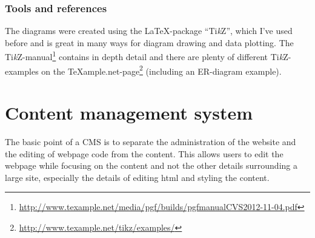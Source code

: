 \documentclass[12pt, a4paper,titlepage]{article}
\begin{document}
\subsubsection{Tools and references}
The diagrams were created using the \LaTeX-package
``Ti\emph{k}Z'', which I've used before and is great in many ways for diagram
drawing and data plotting. The Ti\emph{k}Z-manual\footnote{\url{http://www.texample.net/media/pgf/builds/pgfmanualCVS2012-11-04.pdf}} 
contains in depth detail and there are plenty of different 
Ti\emph{k}Z-examples on the \TeX ample.net-page\footnote{
\url{http://www.texample.net/tikz/examples/}} (including an ER-diagram example).

\section{Content management system}
The basic point of a CMS is to separate the administration of the website and
the editing of webpage code from the content. This allows users to edit the
webpage while focusing on the content and not the other details surrounding
a large site, especially the details of editing html and styling the content.
\end{document}
